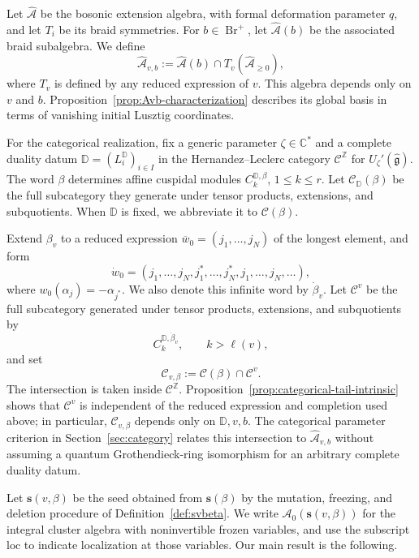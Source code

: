 \documentclass[12pt, reqno]{amsart}
\theoremstyle{plain}
\theoremstyle{definition}
\numberwithin{equation}{section}
\begin{document}
Let $\widehat{\mathcal A}$ be the bosonic extension algebra, with
formal deformation parameter $q$, and let $T_i$ be its braid
symmetries. For $b\in\operatorname{Br}^+$, let
$\widehat{\mathcal A}(b)$ be the associated braid subalgebra. We define
\[
\widehat{\mathcal A}_{v,b}
:=\widehat{\mathcal A}(b)\cap T_v(\widehat{\mathcal A}_{\ge0}),
\]
where $T_v$ is defined by any reduced expression of $v$.
This algebra depends only on $v$ and $b$.
Proposition~\ref{prop:Avb-characterization} describes its global basis
in terms of vanishing initial Lusztig coordinates.

For the categorical realization, fix a generic parameter
$\zeta\in\mathbb C^*$ and a complete duality datum
$\mathbb D=(L_i^{\mathbb D})_{i\in I}$ in the Hernandez--Leclerc
category $\mathscr C^{\mathbb Z}$ for
$U_\zeta'(\widehat{\mathfrak g})$.
The word $\beta$ determines affine cuspidal modules
$C_k^{\mathbb D,\beta}$, $1\le k\le r$.
Let $\mathscr C_{\mathbb D}(\beta)$ be the full subcategory they
generate under tensor products, extensions, and subquotients.
When $\mathbb D$ is fixed, we abbreviate it to $\mathscr C(\beta)$.

Extend $\beta_v$ to a reduced expression
$\overline w_0=(j_1,\ldots,j_N)$ of the longest element, and form
\begin{equation}\label{eq:dotw0}
\dot w_0
=(j_1,\ldots,j_N,j_1^*,\ldots,j_N^*,j_1,\ldots,j_N,\ldots),
\end{equation}
where $w_0(\alpha_j)=-\alpha_{j^*}$. We also denote this infinite word
by $\dot\beta_v$. Let $\mathscr C^v$ be the full subcategory generated
under tensor products, extensions, and subquotients by
\[
C_k^{\mathbb D,\dot\beta_v},\qquad k>\ell(v),
\]
and set
\[
\mathscr C_{v,\beta}:=\mathscr C(\beta)\cap\mathscr C^v.
\]
The intersection is taken inside $\mathscr C^{\mathbb Z}$.
Proposition~\ref{prop:categorical-tail-intrinsic} shows that
$\mathscr C^v$ is independent of the reduced expression and completion
used above; in particular, $\mathscr C_{v,\beta}$ depends only on
$\mathbb D,v,b$.
The categorical parameter criterion in Section~\ref{sec:category}
relates this intersection to $\widehat{\mathcal A}_{v,b}$ without
assuming a quantum Grothendieck-ring isomorphism for an arbitrary
complete duality datum.

Let $\mathbf s(v,\beta)$ be the seed obtained from $\mathbf s(\beta)$
by the mutation, freezing, and deletion procedure of
Definition~\ref{def:svbeta}. We write $\mathcal A_0(\mathbf s(v,\beta))$ for
the integral cluster algebra with noninvertible frozen variables,
and use the subscript $\mathrm{loc}$ to indicate localization at
those variables. Our main result is the following.
\end{document}

